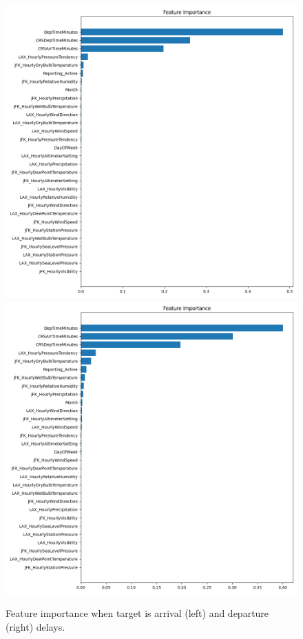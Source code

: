 \begin{figure}
    \centering
    \includegraphics[width=0.49\linewidth]{media/features_ArrDelay.png}
    \includegraphics[width=0.49\linewidth]{media/features_DepDelay.png}
    \caption{Feature importance when target is arrival (left) and departure (right) delays.}
    \label{fig:importance-arr-dep}
\end{figure}

